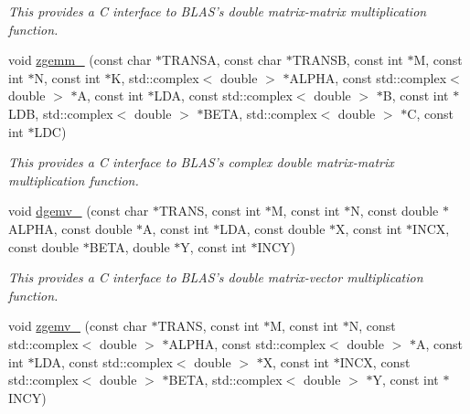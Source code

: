 \begin{DoxyCompactItemize}
\begin{DoxyCompactList}\small\item\em This provides a C interface to B\-L\-A\-S's double matrix-\/matrix multiplication function. \end{DoxyCompactList}\item 
\hypertarget{namespacekeycpp_a29fb4e46ee1b9cce0fd8bc79a2490c72}{void \hyperlink{namespacekeycpp_a29fb4e46ee1b9cce0fd8bc79a2490c72}{zgemm\-\_\-} (const char $\ast$T\-R\-A\-N\-S\-A, const char $\ast$T\-R\-A\-N\-S\-B, const int $\ast$M, const int $\ast$N, const int $\ast$K, std\-::complex$<$ double $>$ $\ast$A\-L\-P\-H\-A, const std\-::complex$<$ double $>$ $\ast$A, const int $\ast$L\-D\-A, const std\-::complex$<$ double $>$ $\ast$B, const int $\ast$L\-D\-B, std\-::complex$<$ double $>$ $\ast$B\-E\-T\-A, std\-::complex$<$ double $>$ $\ast$C, const int $\ast$L\-D\-C)}\label{namespacekeycpp_a29fb4e46ee1b9cce0fd8bc79a2490c72}

\begin{DoxyCompactList}\small\item\em This provides a C interface to B\-L\-A\-S's complex double matrix-\/matrix multiplication function. \end{DoxyCompactList}\item 
\hypertarget{namespacekeycpp_af0676a4a89dbb63f09fc627c05e12699}{void \hyperlink{namespacekeycpp_af0676a4a89dbb63f09fc627c05e12699}{dgemv\-\_\-} (const char $\ast$T\-R\-A\-N\-S, const int $\ast$M, const int $\ast$N, const double $\ast$A\-L\-P\-H\-A, const double $\ast$A, const int $\ast$L\-D\-A, const double $\ast$X, const int $\ast$I\-N\-C\-X, const double $\ast$B\-E\-T\-A, double $\ast$Y, const int $\ast$I\-N\-C\-Y)}\label{namespacekeycpp_af0676a4a89dbb63f09fc627c05e12699}

\begin{DoxyCompactList}\small\item\em This provides a C interface to B\-L\-A\-S's double matrix-\/vector multiplication function. \end{DoxyCompactList}\item 
\hypertarget{namespacekeycpp_aea174778653491b5fd21dd2960c0f7cb}{void \hyperlink{namespacekeycpp_aea174778653491b5fd21dd2960c0f7cb}{zgemv\-\_\-} (const char $\ast$T\-R\-A\-N\-S, const int $\ast$M, const int $\ast$N, const std\-::complex$<$ double $>$ $\ast$A\-L\-P\-H\-A, const std\-::complex$<$ double $>$ $\ast$A, const int $\ast$L\-D\-A, const std\-::complex$<$ double $>$ $\ast$X, const int $\ast$I\-N\-C\-X, const std\-::complex$<$ double $>$ $\ast$B\-E\-T\-A, std\-::complex$<$ double $>$ $\ast$Y, const int $\ast$I\-N\-C\-Y)}\label{namespacekeycpp_aea174778653491b5fd21dd2960c0f7cb}


\end{DoxyCompactItemize}
